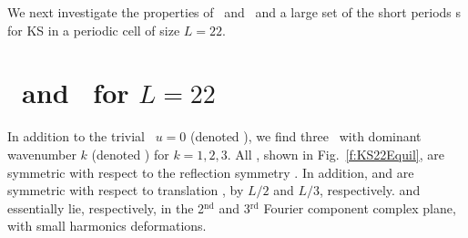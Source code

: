 We next investigate the properties of \eqva\ and \reqva\ and a large set
of the short periods \rpo s for KS in a periodic cell of
size $L=22$.

\section{\Eqva\ and \reqva\ for $L=22$}

In addition to the trivial \eqv\ $u=0$ (denoted ),
we find three \eqva\ with dominant wavenumber $k$
(denoted ) for $k = 1, 2, 3$.  All {\eqva}, shown in
Fig.~\ref{f:KS22Equil}, are symmetric with respect to the reflection
symmetry .
In addition,  and  are symmetric with respect
to translation , by $L/2$ and $L/3$, respectively.
 and  essentially lie, respectively, in
the 2$^\mathrm{nd}$ and 3$^\mathrm{rd}$ Fourier component complex plane,
with small  harmonics deformations.

